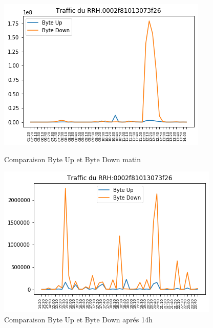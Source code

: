 \documentclass{report}
\begin{document}
\begin{figure}[!htb]
   \begin{minipage}{0.48\textwidth}
     \centering
     \includegraphics[scale=0.5]{images/byte1.png}
     \caption{Comparaison Byte Up et Byte Down matin}\label{Fig:Data1}
   \end{minipage}\hfill
   \begin{minipage}{0.48\textwidth}
     \centering
     \includegraphics[scale=0.5]{images/byte2.png}
     \caption{Comparaison Byte Up et Byte Down aprés 14h }\label{Fig:Data2}
   \end{minipage}
\end{figure} 
\end{document}
